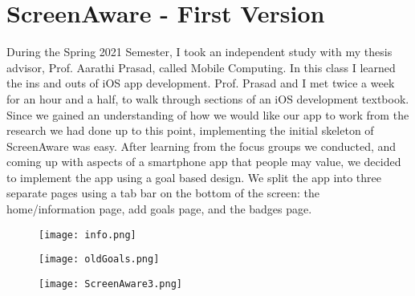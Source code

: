 \documentclass[12pt, title page, manuscript, nonacm]{acmart}
\begin{document}
\section*{ScreenAware - First Version}
\par During the Spring 2021 Semester, I took an independent study with my thesis advisor, Prof. Aarathi Prasad, called Mobile Computing. In this class I learned the ins and outs of iOS app development. Prof. Prasad and I met twice a week for an hour and a half, to walk through sections of an iOS development textbook. Since we gained an understanding of how we would like our app to work from the research we had done up to this point, implementing the initial skeleton of ScreenAware was easy. After learning from the focus groups we conducted, and coming up with aspects of a smartphone app that people may value, we decided to implement the app using a goal based design. We split the app into three separate pages using a tab bar on the bottom of the screen: the home/information page, add goals page, and the badges page.
\begin{figure}[h]
  \texttt{[image: info.png]}
  \caption{}
\endminipage
\hspace{2cm}
    \texttt{[image: oldGoals.png]}
    \caption{}
\endminipage
\hspace{2cm}
    \texttt{[image: ScreenAware3.png]}
    \caption{}
\endminipage
\end{figure}
\end{document}
